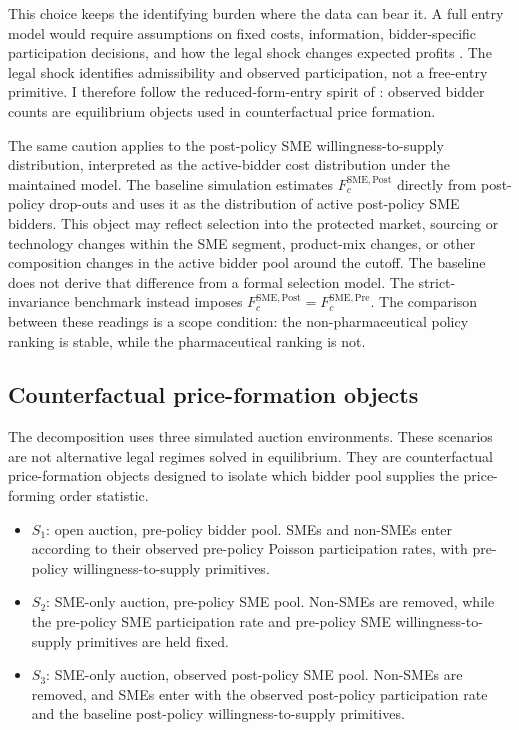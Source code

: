 This choice keeps the identifying burden where the data can bear it. A
full entry model would require assumptions on fixed costs, information,
bidder-specific participation decisions, and how the legal shock changes
expected profits \citep{bajari2014}. The legal shock identifies
admissibility and observed participation, not a free-entry primitive. I
therefore follow the reduced-form-entry spirit of \citet{atheyseira2011}:
observed bidder counts are equilibrium objects used in counterfactual
price formation.

The same caution applies to the post-policy SME willingness-to-supply
distribution, interpreted as the active-bidder cost distribution under the
maintained model. The baseline simulation estimates $F_c^{\mathrm{SME,Post}}$
directly from post-policy drop-outs and uses it as the distribution of
active post-policy SME bidders. This object may reflect selection into the
protected market, sourcing or technology changes within the SME segment,
product-mix changes, or other composition changes in the active bidder pool
around the cutoff. The baseline does not derive that difference from a
formal selection model. The strict-invariance benchmark instead imposes
$F_c^{\mathrm{SME,Post}}=F_c^{\mathrm{SME,Pre}}$. The comparison between
these readings is a scope condition: the non-pharmaceutical policy ranking
is stable, while the pharmaceutical ranking is not.

\subsection{Counterfactual price-formation objects}

The decomposition uses three simulated auction environments. These scenarios
are not alternative legal regimes solved in equilibrium. They are
counterfactual price-formation objects designed to isolate which bidder pool
supplies the price-forming order statistic.

\begin{itemize}
    \item $S_1$: open auction, pre-policy bidder pool. SMEs and non-SMEs
    enter according to their observed pre-policy Poisson participation
    rates, with pre-policy willingness-to-supply primitives.
    \item $S_2$: SME-only auction, pre-policy SME pool. Non-SMEs are removed,
    while the pre-policy SME participation rate and pre-policy SME
    willingness-to-supply primitives are held fixed.
    \item $S_3$: SME-only auction, observed post-policy SME pool. Non-SMEs
    are removed, and SMEs enter with the observed post-policy participation
    rate and the baseline post-policy willingness-to-supply primitives.
\end{itemize}

